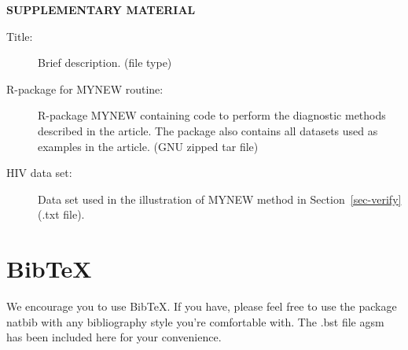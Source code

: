 \documentclass[
  12pt]{article}
\begin{document}
\label{supplementary-material}
\bigskip

\begin{center}

{\large\bf SUPPLEMENTARY MATERIAL}

\end{center}

\begin{description}
\item[Title:]
Brief description. (file type)
\item[R-package for MYNEW routine:]
R-package MYNEW containing code to perform the diagnostic methods
described in the article. The package also contains all datasets used as
examples in the article. (GNU zipped tar file)
\item[HIV data set:]
Data set used in the illustration of MYNEW method in
Section~\ref{sec-verify} (.txt file).
\end{description}

\section{BibTeX}\label{bibtex}

We encourage you to use BibTeX. If you have, please feel free to use the
package natbib with any bibliography style you're comfortable with. The
.bst file agsm has been included here for your convenience. 


\end{document}
